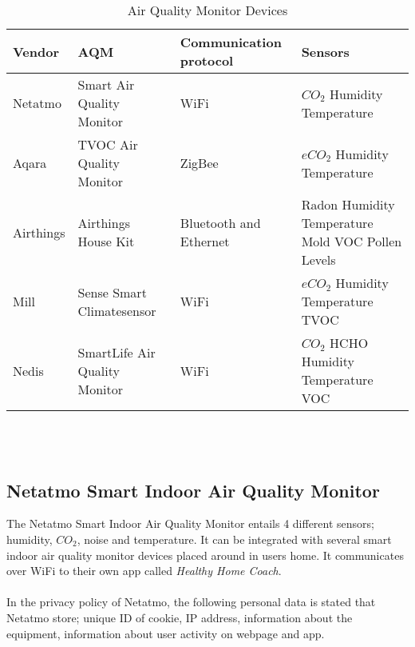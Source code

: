 \begin{table}[!hbtp]
    \centering
    \begin{adjustbox}{width=1\textwidth}
    \begin{tabular}{| p{3cm} | p{5cm} | p{5cm} | p{3cm} |} 
        \hline
        \textbf{Vendor} & \textbf{AQM} & \textbf{Communication protocol} & \textbf{Sensors} \\
        \hline
        Netatmo & Smart Air Quality Monitor & WiFi & \(CO_2\) \newline Humidity \newline Temperature \\
        \hline
        Aqara & TVOC Air Quality Monitor & ZigBee & \(eCO_2\) \newline Humidity \newline Temperature \\
        \hline
        Airthings & Airthings House Kit & Bluetooth and Ethernet & Radon \newline Humidity \newline Temperature \newline Mold \newline VOC \newline Pollen Levels \\
        \hline
        Mill & Sense Smart Climatesensor & WiFi & \(eCO_2\) \newline Humidity \newline Temperature \newline TVOC \\
        \hline
        Nedis & SmartLife Air Quality Monitor & WiFi & \(CO_2\) \newline HCHO \newline Humidity \newline Temperature \newline VOC \\
        \hline
    \end{tabular}
    \end{adjustbox}
    \caption{Air Quality Monitor Devices}
    \label{tab:AQMSurvey}
\end{table}
\\\\
\FloatBarrier
\subsection*{Netatmo Smart Indoor Air Quality Monitor}
The Netatmo Smart Indoor Air Quality Monitor entails 4 different sensors; humidity, \(CO_2\), noise and temperature. It can be integrated with several smart indoor air quality monitor devices placed around in users home. It communicates over WiFi to their own app called \textit{Healthy Home Coach}. 
\\\\
In the privacy policy of Netatmo, the following personal data is stated that Netatmo store; unique ID of cookie, IP address, information about the equipment, information about user activity on webpage and app. 
\\\\
